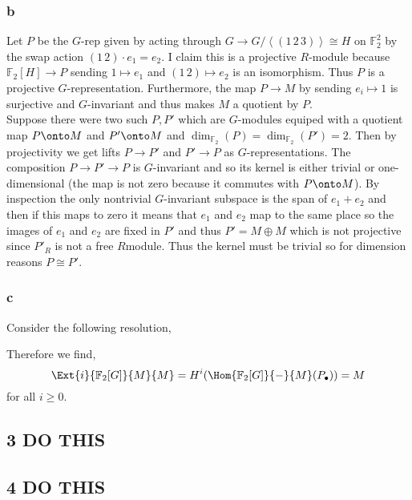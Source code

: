 \documentclass[12pt]{article}
\renewcommand{\F}{\mathbb{F}}
\begin{document}
\subsubsection{b}

Let $P$ be the $G$-rep given by acting through $G \to G / \left< (1 \, 2 \, 3) \right> \cong H$ on $\F_2^2$ by the swap action $(1 \, 2) \cdot e_1 = e_2$. I claim this is a projective $R$-module because $\F_2[H] \to P$ sending $1 \mapsto e_1$ and $(1 \, 2) \mapsto e_2$ is an isomorphism. Thus $P$ is a projective $G$-representation. Furthermore, the map $P \to M$ by sending $e_i \mapsto 1$ is surjective and $G$-invariant and thus makes $M$ a quotient by $P$. 
\bigskip\\
Suppose there were two such $P, P'$ which are $G$-modules equiped with a quotient map $P \onto M$ and $P' \onto M$ and $\dim_{\F_2}(P) = \dim_{\F_2}(P') = 2$. Then by projectivity we get lifts $P \to P'$ and $P' \to P$ as $G$-representations. The composition $P \to P' \to P$ is $G$-invariant and so its kernel is either trivial or one-dimensional (the map is not zero because it commutes with $P \onto M$). By inspection the only nontrivial $G$-invariant subspace is the span of $e_1 + e_2$ and then if this maps to zero it means that $e_1$ and $e_2$ map to the same place so the images of $e_1$ and $e_2$ are fixed in $P'$ and thus $P' = M \oplus M$ which is not projective since $P'_R$ is not a free $R$module. Thus the kernel must be trivial so for dimension reasons $P \cong P'$.

\subsubsection{c}

Consider the following resolution,
\begin{center}
\end{center}
Therefore we find,
\[ \Ext{i}{\F_2[G]}{M}{M} = H^i(\Hom{\F_2[G]}{-}{M}(P_\bullet)) = M \]
for all $i \ge 0$.

\subsection{3 DO THIS}

\subsection{4 DO THIS}
\end{document}
